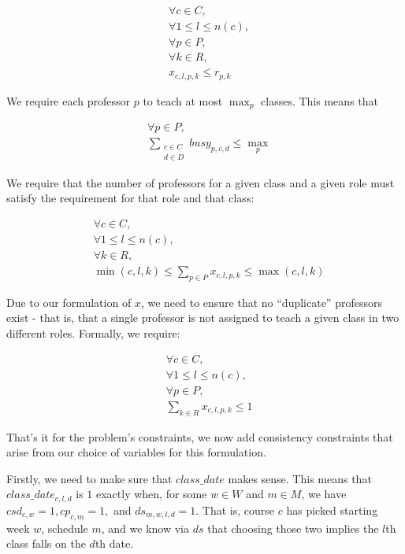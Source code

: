 \begin{align}
  &\forall c \in C,\\
  &\forall 1 \le l \le n(c),\\
  &\forall p \in P,\\
  &\forall k \in R,\\
  &x_{c, l, p, k} \le r_{p, k}
\end{align}

We require each professor $p$ to teach at most $\max_p$ classes. This means that

\begin{align}
  &\forall p \in P,\\
  &\sum_{\substack{c \in C\\d \in D}} busy_{p, c, d} \le \textstyle{\max_p}
\end{align}

We require that the number of professors for a given class and a given role must satisfy the requirement for that role and that class:

\begin{align}
  &\forall c \in C,\\
  &\forall 1 \le l \le n(c),\\
  &\forall k \in R,\\
  &\min(c, l, k) \le \sum_{p \in P} x_{c, l, p, k} \le \max(c, l, k)
\end{align}

Due to our formulation of $x$, we need to ensure that no ``duplicate'' professors exist - that is, that a single professor is not assigned to teach a given class in two different roles. Formally, we require:

\begin{align}
  &\forall c \in C,\\
  &\forall 1 \le l \le n(c),\\
  &\forall p \in P,\\
  &\sum_{k \in R} x_{c, l, p, k} \le 1
\end{align}


That's it for the problem's constraints, we now add consistency constraints that arise from our choice of variables for this formulation.

Firstly, we need to make sure that $class\_date$ makes sense. This means that $class\_date_{c, l, d}$ is $1$ exactly when, for some $w \in W$ and $m \in M$, we have $csd_{c, w} = 1, cp_{c, m} = 1,$ and $ds_{m, w, l, d} = 1$. That is, course $c$ has picked starting week $w$, schedule $m$, and we know via $ds$ that choosing those two implies the $l$th class falls on the $d$th date.


